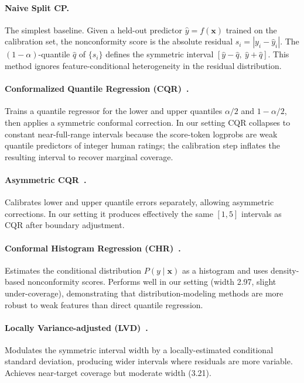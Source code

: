 \documentclass{article}
\begin{document}
\paragraph{Naive Split CP.}
The simplest baseline. Given a held-out predictor $\hat{y} = f(\mathbf{x})$ trained on the calibration set, the nonconformity score is the absolute residual $s_i = |y_i - \hat{y}_i|$. The $(1-\alpha)$-quantile $\hat{q}$ of $\{s_i\}$ defines the symmetric interval $[\hat{y} - \hat{q},\ \hat{y} + \hat{q}]$. This method ignores feature-conditional heterogeneity in the residual distribution.

\paragraph{Conformalized Quantile Regression (CQR)~\citep{romano2019conformalized}.}
Trains a quantile regressor for the lower and upper quantiles $\alpha/2$ and $1-\alpha/2$, then applies a symmetric conformal correction. In our setting CQR collapses to constant near-full-range intervals because the score-token logprobs are weak quantile predictors of integer human ratings; the calibration step inflates the resulting interval to recover marginal coverage.

\paragraph{Asymmetric CQR~\citep{sesia2020comparison}.}
Calibrates lower and upper quantile errors separately, allowing asymmetric corrections. In our setting it produces effectively the same $[1, 5]$ intervals as CQR after boundary adjustment.

\paragraph{Conformal Histogram Regression (CHR)~\citep{sesia2021conformal}.}
Estimates the conditional distribution $P(y \mid \mathbf{x})$ as a histogram and uses density-based nonconformity scores. Performs well in our setting (width 2.97, slight under-coverage), demonstrating that distribution-modeling methods are more robust to weak features than direct quantile regression.

\paragraph{Locally Variance-adjusted (LVD)~\citep{lin2021locally}.}
Modulates the symmetric interval width by a locally-estimated conditional standard deviation, producing wider intervals where residuals are more variable. Achieves near-target coverage but moderate width (3.21).
\end{document}
